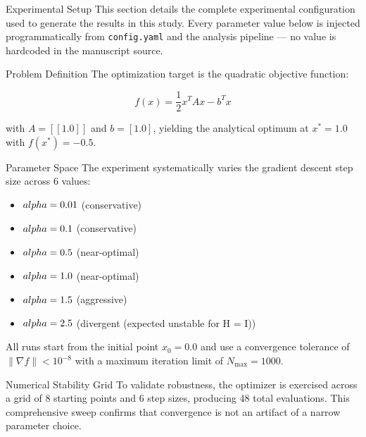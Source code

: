 \documentclass[
  ignorenonframetext,
]{beamer}
\author{\texorpdfstring{}{}}
\date{}
\providecommand{\tightlist}{%
  \setlength{\itemsep}{0pt}\setlength{\parskip}{0pt}}
\begin{document}
\begin{frame}[fragile]{Experimental Setup}
\protect{}\label{experimental-setup}
This section details the complete experimental configuration used to
generate the results in this study. Every parameter value below is
injected programmatically from \texttt{config.yaml} and the analysis
pipeline --- no value is hardcoded in the manuscript source.

\begin{block}{Problem Definition}
\protect{}\label{problem-definition}
The optimization target is the quadratic objective function:

\begin{equation}
\label{eq:quadratic_objective}
f(x) = \frac{1}{2} x^T A x - b^T x
\end{equation}

with \(A = [[1.0]]\) and \(b = [1.0]\), yielding the analytical optimum
at \(x^* = 1.0\) with \(f(x^*) = -0.5\).
\end{block}

\begin{block}{Parameter Space}
\protect{}\label{parameter-space}
The experiment systematically varies the gradient descent step size
across 6 values:

\begin{itemize}
\tightlist
\item
  \(\\alpha = 0.01\) (conservative)
\item
  \(\\alpha = 0.1\) (conservative)
\item
  \(\\alpha = 0.5\) (near-optimal)
\item
  \(\\alpha = 1.0\) (near-optimal)
\item
  \(\\alpha = 1.5\) (aggressive)
\item
  \(\\alpha = 2.5\) (divergent (expected unstable for H = I))
\end{itemize}

All runs start from the initial point \(x_0 = 0.0\) and use a
convergence tolerance of \(\|{\nabla f}\| < 10^{-8}\) with a maximum
iteration limit of \(N_{\max} = 1000\).
\end{block}

\begin{block}{Numerical Stability Grid}
\protect{}\label{numerical-stability-grid}
To validate robustness, the optimizer is exercised across a grid of 8
starting points and 6 step sizes, producing 48 total evaluations. This
comprehensive sweep confirms that convergence is not an artifact of a
narrow parameter choice.
\end{block}


\end{frame}
\end{document}
